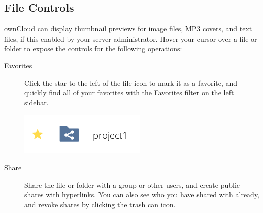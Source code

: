 \documentclass[letterpaper,10pt,english]{sphinxmanual}
\begin{document}
\subsection{File Controls}
\label{files/access_webgui:file-controls}
ownCloud can display thumbnail previews for image files, MP3 covers,
and text files, if this enabled by your server administrator. Hover your cursor
over a file or folder to expose the controls for the following operations:
\begin{description}
\item[{Favorites}] \leavevmode
Click the star to the left of the file icon to mark it as a favorite, and
quickly find all of your favorites with the Favorites filter on the left
sidebar.

\end{description}
\begin{figure}[htbp]
\centering

\includegraphics{files_page-1.png}
\end{figure}
\begin{description}
\item[{Share}] \leavevmode
Share the file or folder with a group or other users, and create public
shares with hyperlinks. You can also see who you have shared with already,
and revoke shares by clicking the trash can icon.

\end{description}
\end{document}
